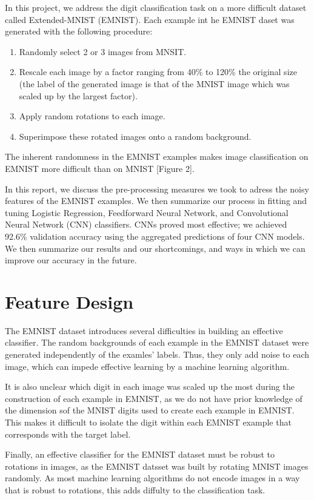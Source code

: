 \documentclass[letterpaper, 10 pt, conference]{ieeeconf}  %
\begin{document}
In this project, we address the digit classification task on a more difficult dataset called Extended-MNIST (EMNIST). Each example int he EMNIST daset was generated with the following procedure:
\begin{enumerate}
\item Randomly select 2 or 3 images from MNSIT.
\item Rescale each image by a factor ranging from 40\% to 120\% the original size (the label of the generated image is that of the MNIST image which was scaled up by the largest factor).
\item Apply random rotations to each image. 
\item Superimpose these rotated images onto a random background.
\end{enumerate}

The inherent randomness in the EMNIST examples makes image classification on EMNIST more difficult than on MNIST [Figure 2]. 

In this report, we discuss the pre-processing measures we took to adress the noisy features of the EMNIST examples. We then summarize our process in fitting and tuning Logistic Regression, Feedforward Neural Network, and Convolutional Neural Network (CNN) classifiers. CNNs proved most effective; we achieved 92.6\% validation accuracy using the aggregated predictions of four CNN models. We then summarize our results and our shortcomings, and ways in which we can improve our accuracy in the future. 

\section{Feature Design}

The EMNIST dataset introduces several difficulties in building an effective classifier. The random backgrounds of each example in the EMNIST dataset were generated independently of the examles' labels. Thus, they only add noise to each image, which can impede effective learning by a machine learning algorithm. 

It is also unclear which digit in each image was scaled up the most during the construction of each example in EMNIST, as we do not have prior knowledge of the dimension sof the MNIST digits used to create each example in EMNIST. This makes it difficult to isolate the digit within each EMNIST example that corresponds with the target label.

Finally, an effective classifier for the EMNIST dataset must be robust to rotations in images, as the EMNIST datsset was built by rotating MNIST images randomly. As most machine learning algorithms do not encode images in a way that is robust to rotations, this adds diffulty to the classification task. 
\end{document}
